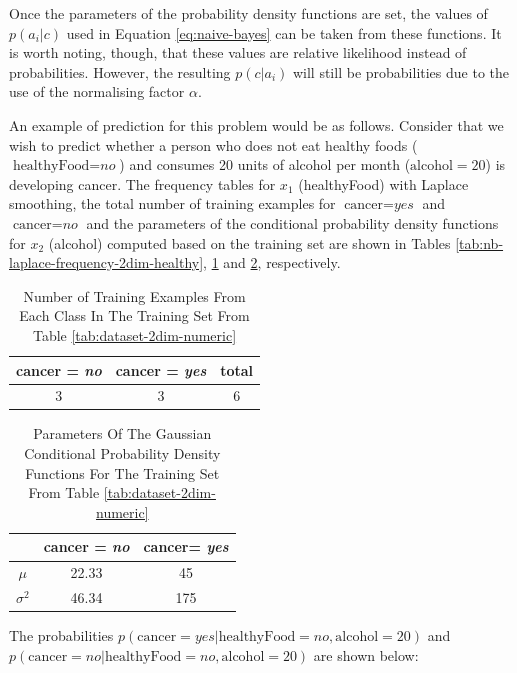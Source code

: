 Once the parameters of the probability density functions are set, the values of $p(a_i|c)$ used in Equation \ref{eq:naive-bayes} can be taken from these functions. It is worth noting, though, that these values are relative likelihood instead of probabilities. However, the resulting $p(c|a_i)$ will still be probabilities due to the use of the normalising factor $\alpha$.

An example of prediction for this problem would be as follows. Consider that we wish to predict whether a person who does not eat healthy foods ($\text{healthyFood} = \textit{no}$) and consumes 20 units of alcohol per month ($\text{alcohol} = 20$) is developing cancer. The frequency tables for $x_1$ (healthyFood) with Laplace smoothing, the total number of training examples for $\text{cancer} = \textit{yes}$ and $\text{cancer} = \textit{no}$ and the parameters of the conditional probability density functions for $x_2$ (alcohol) computed based on the training set are shown in Tables \ref{tab:nb-laplace-frequency-2dim-healthy}, \ref{tab:num-examples-each-class} and \ref{tab:gaussian-parameters}, respectively.

\begin{table}[h]
\caption{Number of Training Examples From Each Class In The Training Set From Table \ref{tab:dataset-2dim-numeric}} \label{tab:num-examples-each-class}
\centering
\begin{tabular}{|c|c|c|}\hline
cancer = \textit{no} & cancer = \textit{yes} & total \\ \hline
3 & 3 & 6 \\ \hline
\end{tabular}
\end{table}


\begin{table}[h]
\caption{Parameters Of The Gaussian Conditional Probability Density Functions For The Training Set From Table \ref{tab:dataset-2dim-numeric}} \label{tab:gaussian-parameters}
\centering
\begin{tabular}{|c|c|c|}\hline
& cancer = \textit{no} & cancer= \textit{yes}  \\ \hline
$\mu$ & 22.33 & 45 \\ \hline
$\sigma^2$ & 46.34 & 175 \\ \hline
\end{tabular}
\end{table}

The probabilities $p(\text{cancer} = \textit{yes} | \text{healthyFood} = \textit{no}, \text{alcohol} = 20)$ and $p(\text{cancer} = \textit{no} | \text{healthyFood} = \textit{no}, \text{alcohol} = 20)$ are shown below:

